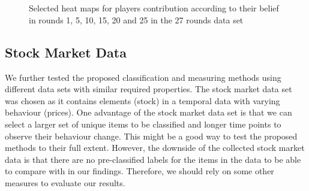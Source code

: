 \begin{figure}[!h]
{\begin{minipage}{\dimexpr \textwidth-2\fboxsep-2\fboxrule}
{			}\\
			\\
			
		\end{minipage}}
		\caption{Selected heat maps for players contribution according to their belief in rounds 1, 5, 10, 15, 20 and 25 in the 27 rounds data set}
		\label{fig:contributionRound27}
	\end{figure}

\subsection{Stock Market Data}
 We further tested the proposed classification and measuring methods using different data sets with similar required properties. The stock market data set was chosen as it contains elements (stock) in a temporal data with varying behaviour (prices). One advantage of the stock market data set is that we can select a larger set of unique items to be classified and longer time points to observe their behaviour change. This might be a good way to test the proposed methods to their full extent. However, the downside of the collected stock market data is that there are no pre-classified labels for the items in the data to be able to compare with in our findings. Therefore, we should rely on some other measures to evaluate our results.

